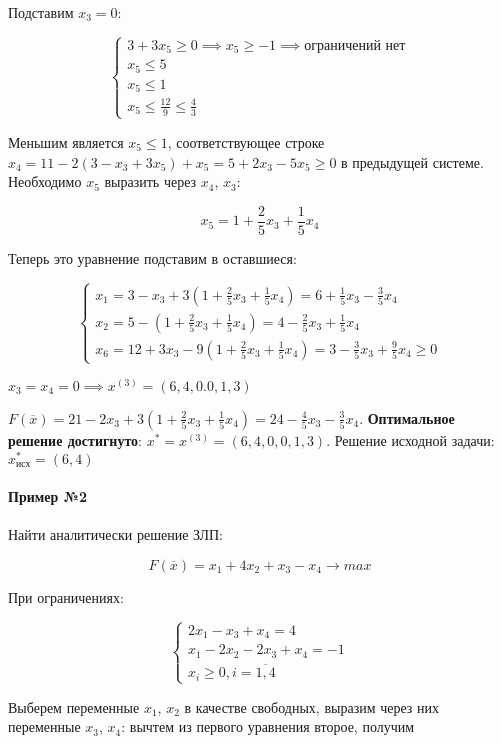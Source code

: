 \documentclass{article}
\begin{document}
Подставим $x_3 = 0$:

$$
\begin{cases}
    3 + 3x_5 \ge 0 \implies x_5 \ge -1 \implies \text{ограничений нет}\\
    x_5 \le 5 \\
    x_5 \le 1 \\
    x_5 \le \frac{12}{9} \le \frac{4}{3}
\end{cases}
$$

Меньшим является $x_{5} \le 1$, соответствующее строке $x_4 = 11 - 2 (3 - x_3 + 3x_5) + x_5 = 5 + 2x_3 - 5x_5 \ge 0$ в предыдущей системе. Необходимо $x_5$ выразить через $x_4$, $x_3$:

$$
x_5 = 1 + \frac{2}{5} x_3 + \frac{1}{5} x_4
$$

Теперь это уравнение подставим в оставшиеся:

$$
\begin{cases}
  x_1 = 3 - x_3 + 3 (1 + \frac{2}{5} x_3 + \frac{1}{5} x_4) = 6 + \frac{1}{5} x_3 - \frac{3}{5} x_4 \\
  x_2 = 5 - (1 + \frac{2}{5} x_3 + \frac{1}{5} x_4) = 4 - \frac{2}{5}x_3 + \frac{1}{5} x_4 \\
  x_6 = 12 + 3x_3 - 9 (1 + \frac{2}{5} x_3 + \frac{1}{5} x_4) = 3 - \frac{3}{5} x_3 + \frac{9}{5} x_4 \ge 0
\end{cases}
$$

$x_3 = x_4 = 0 \implies x^{(3)} = (6, 4, 0. 0, 1, 3)$

$F(\overline{x}) = 21 - 2x_3 + 3 (1 + \frac{2}{5} x_3 + \frac{1}{5} x_4) = 24 - \frac{4}{5} x_3 - \frac{3}{5} x_4$. \textbf{Оптимальное решение достигнуто}: $x^{*} = x^{(3)} = (6, 4, 0, 0, 1, 3)$. Решение исходной задачи: $x^{*}_{\text{исх}} = (6, 4)$

\paragraph{Пример №2}

Найти аналитически решение ЗЛП:

$$
F(\overline{x}) = x_1 + 4x_2 + x_3 - x_4 \to max
$$

При ограничениях:

$$
\begin{cases}
    2x_1 - x_3 + x_4 = 4 \\
    x_1 - 2x_2 - 2x_3 + x_4 = -1 \\
    x_i \ge 0, i = \overline{1, 4}
\end{cases}
$$

Выберем переменные $x_1$, $x_2$ в качестве свободных, выразим через них переменные $x_3$, $x_4$: вычтем из первого уравнения второе, получим  
\end{document}
